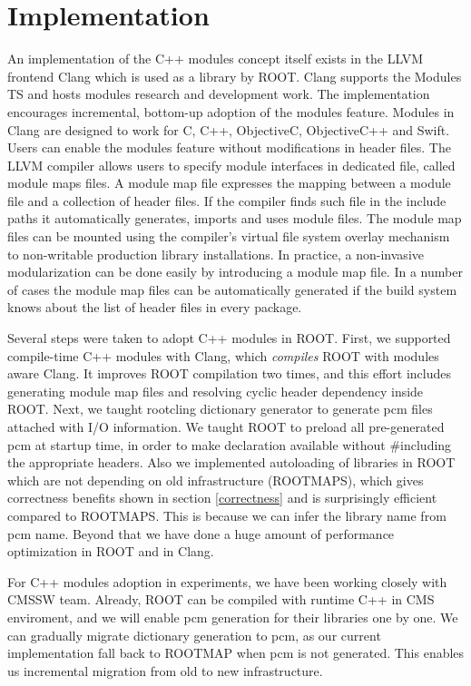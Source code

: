 \documentclass{webofc}
\begin{document}
\section{Implementation}
\label{implementation}

An implementation of the C++ modules concept itself exists in the LLVM frontend Clang which is used as a library by ROOT. Clang supports the Modules TS and hosts modules research and development work. The implementation encourages incremental, bottom-up adoption of the modules feature. Modules in Clang are designed to work for C, C++, ObjectiveC, ObjectiveC++ and Swift. Users can enable the modules feature without modifications in header files. The LLVM compiler allows users to specify module interfaces in dedicated file, called module maps files. A module map file expresses the mapping between a module file and a collection of header files. If the compiler finds such file in the include paths it automatically generates, imports and uses module files. The module map files can be mounted using the compiler’s virtual file system overlay mechanism to non-writable production library installations. In practice, a non-invasive modularization can be done easily by introducing a module map file. In a number of cases the module map files can be automatically generated if the build system knows about the list of header files in every package.

Several steps were taken to adopt C++ modules in ROOT. First, we supported compile-time C++ modules with Clang, which {\it compiles} ROOT with modules aware Clang. It improves ROOT compilation two times, and this effort includes generating module map files and resolving cyclic header dependency inside ROOT. Next, we taught rootcling dictionary generator to generate pcm files attached with I/O information. We taught ROOT to preload all pre-generated pcm at startup time, in order to make declaration available without \#including the appropriate headers. Also we implemented autoloading of libraries in ROOT which are not depending on old infrastructure (ROOTMAPS), which gives correctness benefits shown in section \ref{correctness} and is surprisingly efficient compared to ROOTMAPS. This is because we can infer the library name from pcm name. Beyond that we have done a huge amount of performance optimization in ROOT and in Clang.

For C++ modules adoption in experiments, we have been working closely with CMSSW team. Already, ROOT can be compiled with runtime C++ in CMS enviroment, and we will enable pcm generation for their libraries one by one. We can gradually migrate dictionary generation to pcm, as our current implementation fall back to ROOTMAP when pcm is not generated. This enables us incremental migration from old to new infrastructure.
\end{document}
